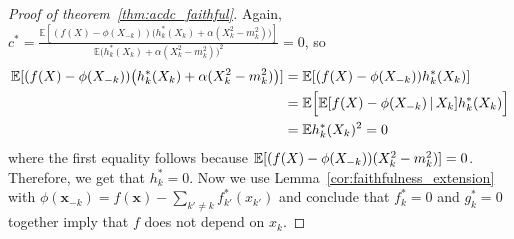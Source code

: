 \begin{proof}[Proof of theorem~\ref{thm:acdc_faithful}]
Again, $c^* = \frac{\mathbb{E}[(f(X)-\phi(X_{-k}))\big( 
           h^*_k(X_k) + \alpha (X_k^2 - m_k^2) \big)]}{\mathbb{E}
       \big( h^*_k(X_k) + \alpha (X_k^2 - m_k^2) \big)^2} = 0$, so
\begin{align*}
\mathbb{E}[ (f(X)-\phi(X_{-k})) \big( h^*_k(X_k) + \alpha (X_k^2-m_k^2) \big) ] &= 
\mathbb{E}[ (f(X) - \phi(X_{-k})) h^*_k(X_k) ] \\
& = \mathbb{E}\Big[ \mathbb{E}[ f(X) - \phi(X_{-k}) {\,|\,} X_k]  h^*_k(X_k) \Big] \\
& = \mathbb{E} h^*_k(X_k)^2 = 0
\end{align*}
where the first equality follows because ${\mathbb E}[ (f(X) - \phi(X_{-k})) (X_k^2 - m_k^2)] = 0$. Therefore, we get that $h^*_k = 0$. Now we use
Lemma~\ref{cor:faithfulness_extension} with $\phi(\mathbf{x}_{-k}) =
f(\mathbf{x}) - \sum_{k' \neq k} f^*_{k'} (x_{k'})$ and conclude that
$f^*_k = 0$ and $g^*_k = 0$ together imply that $f$ does not depend on $x_k$.
\end{proof}








